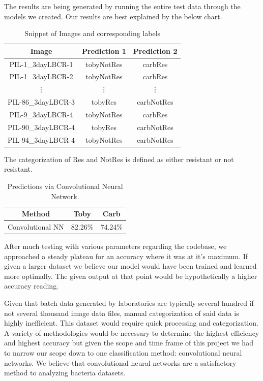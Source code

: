 \documentclass[conference]{IEEEtran}
\begin{document}
The results are being generated by running the entire test data through the models we created. Our results are best explained by the below chart.

\begin{table}[h]
\begin{center}
\begin{tabular}{| c | c | c |}
\hline
Image & Prediction 1 & Prediction 2 \\ \hline \hline
PIL-1\_3dayLBCR-1 & tobyNotRes & carbRes \\ \hline
PIL-1\_3dayLBCR-2 & tobyNotRes & carbRes \\ \hline
\vdots & \vdots & \vdots \\ \hline
PIL-86\_3dayLBCR-3 & tobyRes & carbNotRes \\ \hline
PIL-9\_3dayLBCR-4 & tobyNotRes & carbRes \\ \hline
PIL-90\_3dayLBCR-4 & tobyRes  & carbNotRes \\ \hline
PIL-94\_3dayLBCR-4 & tobyNotRes & carbNotRes \\ \hline
\end{tabular}
\caption{Snippet of Images and corresponding labels}
\label{tabDeliverable}
\end{center}
\end{table}

The categorization of Res and NotRes is defined as either resistant or not resistant. 

\begin{table}[h]
\begin{center}
\begin{tabular}{| c | c | c |}
\hline
Method & Toby & Carb \\ \hline \hline
Convolutional NN & 82.26\% & {74.24\%} \\ \hline

\end{tabular}
\caption{Predictions via Convolutional Neural Network.}
\label{tabSummary}
\end{center}
\end{table}

After much testing with various parameters regarding the codebase, we approached a steady plateau for an accuracy where it was at it's maximum. If given a larger dataset we believe our model would have been trained and learned more optimally. The given output at that point would be hypothetically a higher accuracy reading. 

Given that batch data generated by laboratories are typically several hundred if not several thousand image data files, manual categorization of said data is highly inefficient. This dataset would require quick processing and categorization. A variety of methodologies would be necessary to determine the highest efficiency and highest accuracy but given the scope and time frame of this project we had to narrow our scope down to one classification method: convolutional neural networks.  
We believe that convolutional neural networks are a satisfactory method to analyzing bacteria datasets. 
\end{document}
